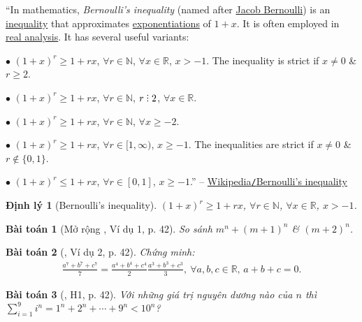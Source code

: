 \documentclass{article}
\numberwithin{equation}{section}
\newtheorem{baitoan}{Bài toán}[section]
\newtheorem{dinhly}{Định lý}[section]
\DeclareRobustCommand{\divby}{%
	\mathrel{\vbox{\baselineskip.65ex\lineskiplimit0pt\hbox{.}\hbox{.}\hbox{.}}}%
}
\begin{document}
``In mathematics, \textit{Bernoulli's inequality} (named after \href{https://en.wikipedia.org/wiki/Jacob_Bernoulli}{Jacob Bernoulli}) is an \href{https://en.wikipedia.org/wiki/Inequality_(mathematics)}{inequality} that approximates \href{https://en.wikipedia.org/wiki/Exponentiation}{exponentiations} of $1 + x$. It is often employed in \href{https://en.wikipedia.org/wiki/Real_analysis}{real analysis}. It has several useful variants:
\begin{enumerate*}
	\item[$\bullet$] $(1 + x)^r\ge 1 + rx$, $\forall r\in\mathbb{N}$, $\forall x\in\mathbb{R}$, $x > - 1$. The inequality is strict if $x\ne 0$ \& $r\ge 2$.
	\item[$\bullet$] $(1 + x)^r\ge 1 + rx$, $\forall r\in\mathbb{N}$, $r\divby 2$, $\forall x\in\mathbb{R}$.
	\item[$\bullet$] $(1 + x)^r\ge 1 + rx$, $\forall r\in\mathbb{N}$, $\forall x\ge -2$.
	\item[$\bullet$] $(1 + x)^r\ge 1 + rx$, $\forall r\in[1,\infty)$, $x\ge -1$. The inequalities are strict if $x\ne 0$ \& $r\notin\{0,1\}$.
	 \item[$\bullet$] $(1 + x)^r\le 1 + rx$, $\forall r\in[0,1]$, $x\ge -1$.'' -- \href{https://en.wikipedia.org/wiki/Bernoulli%27s_inequality}{Wikipedia\texttt{/}Bernoulli's inequality}
\end{enumerate*}

\begin{dinhly}[Bernoulli's inequality]
	$(1 + x)^r\ge 1 + rx$, $\forall r\in\mathbb{N}$, $\forall x\in\mathbb{R}$, $x > - 1$.
\end{dinhly}

\begin{baitoan}[Mở rộng \cite{TL_chuyen_Toan_Giai_Tich_12}, Ví dụ 1, p. 42]
	So sánh $m^n + (m + 1)^n$ \& $(m + 2)^n$.
\end{baitoan}

\begin{baitoan}[\cite{TL_chuyen_Toan_Giai_Tich_12}, Ví dụ 2, p. 42]
	Chứng minh:
	\begin{align*}
		\frac{a^7 + b^7 + c^7}{7} = \frac{a^4 + b^4 + c^4}{2}\frac{a^3 + b^3 + c^3}{3},\ \forall a,b,c\in\mathbb{R},\,a + b + c = 0.
	\end{align*}
\end{baitoan}

\begin{baitoan}[\cite{TL_chuyen_Toan_Giai_Tich_12}, H1, p. 42]
	Với những giá trị nguyên dương nào của $n$ thì $\sum_{i=1}^{9} i^n = 1^n + 2^n + \cdots + 9^n < 10^n$?
\end{baitoan}
\end{document}
